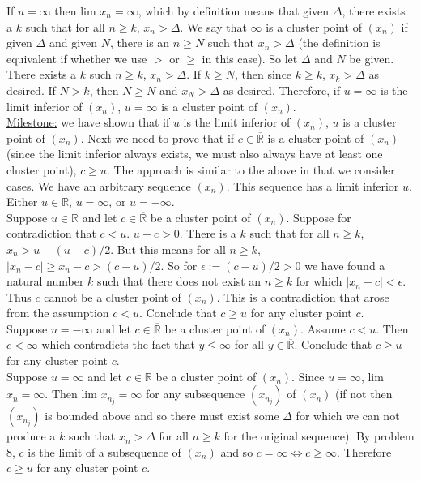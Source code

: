 \documentclass[a4paper]{article}
\begin{document}
If $u = \infty$ then lim $x_n = \infty$, which by definition means that given $\Delta$, there exists a $k$ such that for all $n \geq k$, $x_n > \Delta$. We say that $\infty$ is a cluster point of $(x_n)$ if given $\Delta$ and given $N$, there is an $n \geq N$ such that $x_n > \Delta$ (the definition is equivalent if whether we use $>$ or $\geq$ in this case). So let $\Delta$ and $N$ be given. There exists a $k$ such $n \geq k$, $x_n > \Delta$. If $k \geq N$, then since $k\geq k$, $x_k > \Delta$ as desired. If $N>k$, then $N\geq N$ and $x_N > \Delta$ as desired. Therefore, if $u = \infty$ is the limit inferior of $(x_n)$, $u = \infty$ is a cluster point of $(x_n)$. \\

\underline{Milestone:} we have shown that if $u$ is the limit inferior of $(x_n)$, $u$ is a cluster point of $(x_n)$. Next we need to prove that if $c \in \overline{\mathbb{R}}$ is a cluster point of $(x_n)$ (since the limit inferior always exists, we must also always have at least one cluster point), $c\geq u$. The approach is similar to the above in that we consider cases. We have an arbitrary sequence $(x_n)$. This sequence has a limit inferior $u$. Either $u \in \mathbb{R}$, $u = \infty$, or $u = -\infty$.\\

Suppose $u \in \mathbb{R}$ and let $c \in \overline{\mathbb{R}}$ be a cluster point of $(x_n)$. Suppose for contradiction that $c<u$. $u-c>0$. There is a $k$ such that for all $n\geq k$, $x_n > u - (u-c)/2$. But this means for all $n\geq k$, $|x_n - c| \geq x_n - c > (c-u)/2$. So for $\epsilon := (c-u)/2 >0$ we have found a natural number $k$ such that there does not exist an $n\geq k$ for which $|x_n-c| < \epsilon$. Thus $c$ cannot be a cluster point of $(x_n)$. This is a contradiction that arose from the assumption $c<u$. Conclude that $c \geq u$ for any cluster point $c$. \\

Suppose $u =-\infty$ and let $c \in \overline{\mathbb{R}}$ be a cluster point of $(x_n)$. Assume $c<u$. Then $c<\infty$ which contradicts the fact that $y\leq \infty$ for all $y \in \overline{\mathbb{R}}$. Conclude that $c\geq u$ for any cluster point $c$. \\

Suppose $u =\infty$ and let $c \in \overline{\mathbb{R}}$ be a cluster point of $(x_n)$. Since $u = \infty$, lim $x_n = \infty$. Then lim $x_{n_j} = \infty$ for any subsequence $(x_{n_j})$ of $(x_n)$ (if not then $(x_{n_j})$ is bounded above and so there must exist some $\Delta$ for which we can not produce a $k$ such that $x_n > \Delta$ for all $n\geq k$ for the original sequence). By problem 8, $c$ is the limit of a subsequence of $(x_n)$ and so $c = \infty \iff c\geq \infty$. Therefore $c\geq u$ for any cluster point $c$. \\
\end{document}
